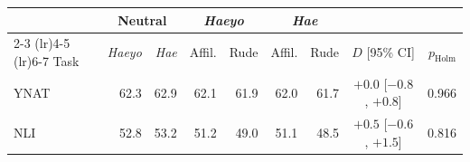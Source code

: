 \begin{tabular}{lrrrrrrcr}
\toprule
 & \multicolumn{2}{c}{Neutral} & \multicolumn{2}{c}{\textit{Haeyo}} & \multicolumn{2}{c}{\textit{Hae}} & & \\
\cmidrule(lr){2-3} \cmidrule(lr){4-5} \cmidrule(lr){6-7}
Task & \textit{Haeyo} & \textit{Hae} & Affil. & Rude & Affil. & Rude & $D$ [95\% CI] & $p_{\mathrm{Holm}}$ \\
\midrule
YNAT & 62.3 & 62.9 & 62.1 & 61.9 & 62.0 & 61.7 & $+0.0$ [$-0.8$, $+0.8$] & 0.966 \\
NLI & 52.8 & 53.2 & 51.2 & 49.0 & 51.1 & 48.5 & $+0.5$ [$-0.6$, $+1.5$] & 0.816 \\
\bottomrule
\end{tabular}
